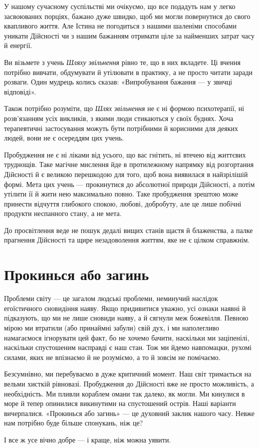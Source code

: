 У нашому сучасному суспільстві ми очікуємо, що все подадуть нам у легко засвоюваних порціях, бажано дуже швидко, щоб ми могли повернутися до свого квапливого життя. Але Істина не погодиться з нашими шаленіми способами уникати Дійсності чи з нашим бажанням отримати ціле за найменших затрат часу й енергії.

Ви візьмете з учень \emph{Шляху звільнення} рівно те, що в них вкладете. Ці вчення потрібно вивчати, обдумувати й утілювати в практику, а не просто читати заради розваги. Один мудрець колись сказав: «Випробування бажання — у звичці відповіді».

Також потрібно розуміти, що \emph{Шлях звільнення} не є ні формою психотерапії, ні розв'язанням усіх викликів, з якими люди стикаються у своїх буднях. Хоча терапевтичні застосування можуть бути потрібними й корисними для деяких людей, вони не є осереддям цих учень.

Пробудження не є ні ліками від усього, що вас гнітить, ні втечею від життєвих труднощів. Таке магічне мислення йде в протилежному напрямку від розгортання Дійсності й є великою перешкодою для того, щоб вона виявилася в найзрілішій формі. Мета цих учень — прокинутися до абсолютної природи Дійсності, а потім утілити її й жити нею максимально повно. Таке пробудження зрештою може принести відчуття глибокого спокою, любові, добробуту, але це лише побічні продукти неспанного стану, а не мета.

До просвітлення веде не пошук дедалі вищих станів щастя й блаженства, а палке прагнення Дійсності та щире незадоволення життям, яке не є цілком справжнім.

\section*{Прокинься або загинь}

Проблеми світу — це загалом людські проблеми, неминучий наслідок егоїстичного сновидіння наяву. Якщо придивитися уважно, усі ознаки наявні й підказують, що ми не лише сновиди наяву, а й сягнули меж божевілля. Певною мірою ми втратили (або принаймні забули) свій дух, і ми наполегливо намагаємося ігнорувати цей факт, бо не хочемо бачити, наскільки ми заціпенілі, наскільки спустошеним насправді є наш стан. Тож ми йдемо навпомацки, рухомі силами, яких не впізнаємо й не розуміємо, а то й зовсім не помічаємо.

Безсумнівно, ми перебуваємо в дуже критичний момент. Наш світ тримається на вельми хисткій рівновазі. Пробудження до Дійсності вже не просто можливість, а необхідність. Ми пливли кораблем омани так далеко, як могли. Ми кинулися в море й тепер опинилися викинутими на спустошений острів. Наші варіанти вичерпалися. «Прокинься або загинь» — це духовний заклик нашого часу. Невже нам потрібно буде більше спонукань, ніж це?

І все ж усе вічно добре — і краще, ніж можна уявити.
